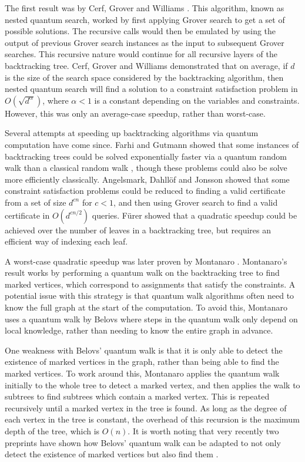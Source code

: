 The first result was by Cerf, Grover and Williams \cite{cerf2000}. This algorithm, known as nested quantum search, worked by first applying Grover search to get a set of possible solutions. The recursive calls would then be emulated by using the output of previous Grover search instances as the input to subsequent Grover searches. This recursive nature would continue for all recursive layers of the backtracking tree. Cerf, Grover and Williams demonstrated that on average, if $d$ is the size of the search space considered by the backtracking algorithm, then nested quantum search will find a solution to a constraint satisfaction problem in $O(\sqrt{d^\alpha})$, where $\alpha<1$ is a constant depending on the variables and constraints. However, this was only an average-case speedup, rather than worst-case.

Several attempts at speeding up backtracking algorithms via quantum computation have come since. Farhi and Gutmann \cite{farhi1998} showed that some instances of backtracking trees could be solved exponentially faster via a quantum random walk than a classical random walk \cite{farhi1998}, though these problems could also be solve more efficiently classically. Angelsmark, Dahll{\"o}f and Jonsson showed that some constraint satisfaction problems could be reduced to finding a valid certificate from a set of size $d^{cn}$ for $c<1$, and then using Grover search to find a valid certificate in $O(d^{cn/2})$ queries. F\"{u}rer \cite{furer2008} showed that a quadratic speedup could be achieved over the number of leaves in a backtracking tree, but requires an efficient way of indexing each leaf.

A worst-case quadratic speedup was later proven by Montanaro \cite{montanaro2015}. Montanaro's result works by performing a quantum walk on the backtracking tree to find marked vertices, which correspond to assignments that satisfy the constraints. A potential issue with this strategy is that quantum walk algorithms often need to know the full graph at the start of the computation. To avoid this, Montanaro uses a quantum walk by Belovs \cite{belovs2013,belovs13a} where steps in the quantum walk only depend on local knowledge, rather than needing to know the entire graph in advance.

One weakness with Belovs' quantum walk is that it is only able to detect the existence of marked vertices in the graph, rather than being able to find the marked vertices. To work around this, Montanaro applies the quantum walk initially to the whole tree to detect a marked vertex, and then applies the walk to subtrees to find subtrees which contain a marked vertex. This is repeated recursively until a marked vertex in the tree is found. As long as the degree of each vertex in the tree is constant, the overhead of this recursion is the maximum depth of the tree, which is $O(n)$. It is worth noting that very recently two preprints have shown how Belovs' quantum walk can be adapted to not only detect the existence of marked vertices but also find them \cite{apers2019, piddock2019}.

